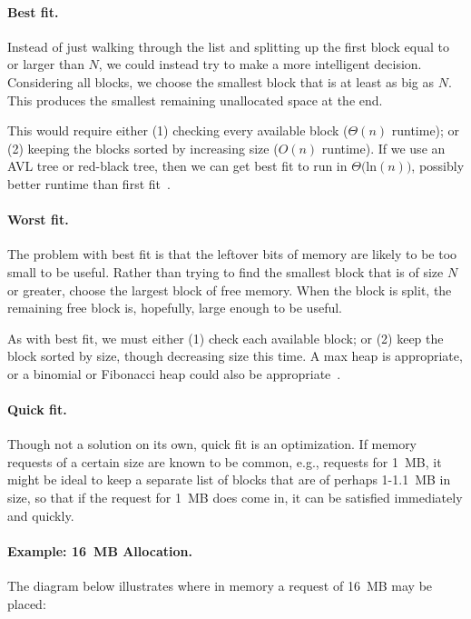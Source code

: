 \paragraph{Best fit.}
Instead of just walking through the list and splitting up the first block equal to or larger than $N$, we could instead try to make a more intelligent decision. Considering all blocks, we choose the smallest block that is at least as big as $N$. This produces the smallest remaining unallocated space at the end. 

This would require either (1) checking every available block ($\Theta(n)$ runtime); or (2) keeping the blocks sorted by increasing size ($O(n)$ runtime). If we use an AVL tree or red-black tree, then we can get best fit to run in $\Theta($ln$(n))$, possibly better runtime than first fit~\cite{mte241}.


\paragraph{Worst fit.}
The problem with best fit is that the leftover bits of memory are likely to be too small to be useful. Rather than trying to find the smallest block that is of size $N$ or greater, choose the largest block of free memory. When the block is split, the remaining free block is, hopefully, large enough to be useful. 

As with best fit, we must either (1) check each available block; or (2) keep the block sorted by size, though decreasing size this time. A max heap is appropriate, or a binomial or Fibonacci heap could also be appropriate~\cite{mte241}.

\paragraph{Quick fit.}
Though not a solution on its own, quick fit is an optimization. If memory requests of a certain size are known to be common, e.g., requests for 1~MB, it might be ideal to keep a separate list of blocks that are of perhaps 1-1.1~MB in size, so that if the request for 1~MB does come in, it can be satisfied immediately and quickly. 



\paragraph{Example: 16~MB Allocation.} The diagram below illustrates where in memory a request of 16~MB may be placed:

